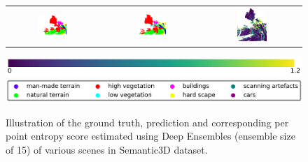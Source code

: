 \begin{figure}[h!]
\begin{tabular}{ccc}
            \includegraphics[width=0.33\textwidth, height=0.18\textheight]{images/seg_output/sem3d_seg_output/3_GT.pdf} &
            \includegraphics[width=0.33\textwidth, height=0.18\textheight]{images/seg_output/sem3d_seg_output/3_Pred.pdf}& 
            \includegraphics[width=0.33\textwidth, height=0.18\textheight]{images/seg_output/sem3d_seg_output/ent_de_3.pdf}\\
        \end{tabular}
        \includegraphics[scale=0.45]{images/ent_legend.pdf}
        \includegraphics[scale=0.45]{images/legend.png}
        \caption{Illustration of the ground truth, prediction and corresponding per point entropy score estimated using Deep Ensembles (ensemble size of 15) of various scenes in Semantic3D dataset.}
        \label{fig:de_sem3d_entmap}
    \end{figure}

